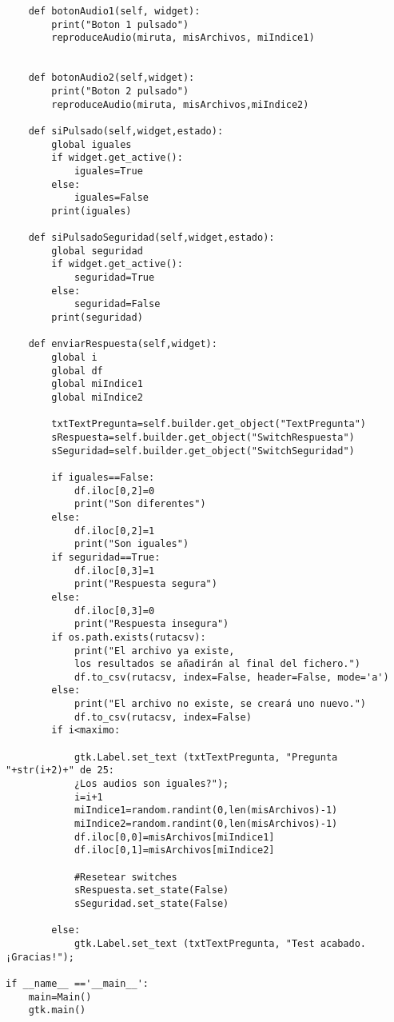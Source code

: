 \documentclass[11pt,a4paper,twoside]{book}
\begin{document}
\begin{verbatim}
    def botonAudio1(self, widget):
        print("Boton 1 pulsado")
        reproduceAudio(miruta, misArchivos, miIndice1)


    def botonAudio2(self,widget):
        print("Boton 2 pulsado")
        reproduceAudio(miruta, misArchivos,miIndice2)

    def siPulsado(self,widget,estado):
        global iguales
        if widget.get_active():
            iguales=True
        else:
            iguales=False
        print(iguales)

    def siPulsadoSeguridad(self,widget,estado):
        global seguridad
        if widget.get_active():
            seguridad=True
        else:
            seguridad=False
        print(seguridad)

    def enviarRespuesta(self,widget):
        global i
        global df
        global miIndice1
        global miIndice2

        txtTextPregunta=self.builder.get_object("TextPregunta")
        sRespuesta=self.builder.get_object("SwitchRespuesta")
        sSeguridad=self.builder.get_object("SwitchSeguridad")
        
        if iguales==False:
            df.iloc[0,2]=0
            print("Son diferentes")
        else:
            df.iloc[0,2]=1
            print("Son iguales")
        if seguridad==True:
            df.iloc[0,3]=1
            print("Respuesta segura")
        else:
            df.iloc[0,3]=0
            print("Respuesta insegura")
        if os.path.exists(rutacsv):
            print("El archivo ya existe, 
            los resultados se añadirán al final del fichero.")
            df.to_csv(rutacsv, index=False, header=False, mode='a')
        else:
            print("El archivo no existe, se creará uno nuevo.")
            df.to_csv(rutacsv, index=False)
        if i<maximo:

            gtk.Label.set_text (txtTextPregunta, "Pregunta "+str(i+2)+" de 25: 
            ¿Los audios son iguales?");
            i=i+1
            miIndice1=random.randint(0,len(misArchivos)-1)
            miIndice2=random.randint(0,len(misArchivos)-1)
            df.iloc[0,0]=misArchivos[miIndice1]
            df.iloc[0,1]=misArchivos[miIndice2]
            
            #Resetear switches
            sRespuesta.set_state(False)
            sSeguridad.set_state(False)
            
        else:
            gtk.Label.set_text (txtTextPregunta, "Test acabado. ¡Gracias!");

if __name__ =='__main__':
    main=Main()
    gtk.main()
\end{verbatim}
\end{document}
